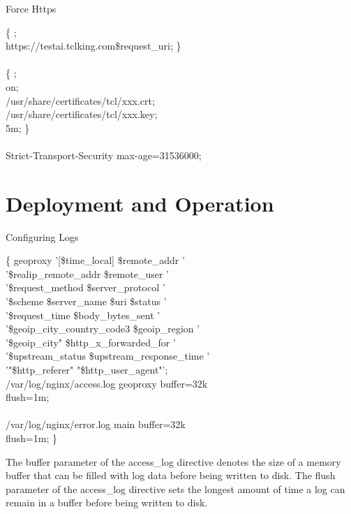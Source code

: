 \documentclass{beamer}
\begin{document}
\begin{frame}{Force Https}
	\vspace{0.02\textheight}
	\scriptsize
	\begin{Alms*}
		  \{ \NI
			 ; \\
			  https://testai.tclking.com\$request\_uri;
		\ND \}
		\\
		\\
		  \{ \NI
		 ; \\
		          on; \\
		     /usr/share/certificates/tcl/xxx.crt; \\
		  /usr/share/certificates/tcl/xxx.key; \\
		
		  5m;
		\ND \}
		\\
		
		\\
		 Strict-Transport-Security max-age=31536000;
	\end{Alms*}
\end{frame}



\section{Deployment and Operation}

\begin{frame}{Configuring Logs}
	\scriptsize
	\begin{Alms*}
		 \{ \NI
			  geoproxy \NI
			'[\$time\_local] \$remote\_addr ' \\
			'\$realip\_remote\_addr \$remote\_user ' \\
			'\$request\_method \$server\_protocol ' \\
			'\$scheme \$server\_name \$uri \$status ' \\
			'\$request\_time \$body\_bytes\_sent ' \\
			'\$geoip\_city\_country\_code3 \$geoip\_region ' \\
			'\$geoip\_city" \$http\_x\_forwarded\_for ' \\
			'\$upstream\_status \$upstream\_response\_time ' \\
			'"\$http\_referer" "\$http\_user\_agent"';
			\ND
			\\
		
			 /var/log/nginx/access.log geoproxy buffer=32k  \\
			flush=1m; \\
			\\
			 /var/log/nginx/error.log main buffer=32k \\
			flush=1m;
		\ND \}
	\end{Alms*}

	The buffer parameter of the access\_log directive denotes the size of a memory buffer that can be filled with log data before being written to disk. The flush parameter of the access\_log directive sets the longest amount of time a log can remain in a buffer before being written to disk. 
\end{frame}
\end{document}
